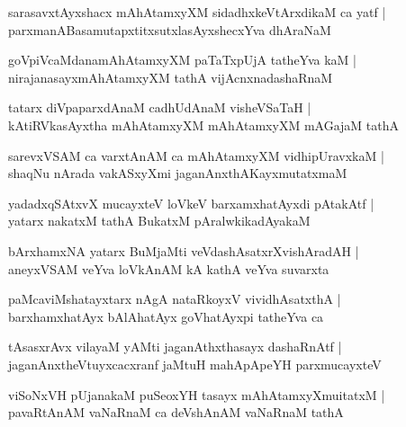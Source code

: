 \documentclass[twoside,12pt,openright]{book}
\newcounter{shloka}[chapter]
\begin{document}
\begin{shloka}%
sarasavxtAyxshacx mAhAtamxyXM sidadhxkeVtArxdikaM ca yatf |\\
parxmanABasamutapxtitxsutxlasAyxshecxYva dhAraNaM 
\end{shloka}

\begin{shloka}%
goVpiVcaMdanamAhAtamxyXM paTaTxpUjA tatheYva kaM |\\
nirajanasayxmAhAtamxyXM tathA vijAcnxnadashaRnaM 
\end{shloka}

\begin{shloka}%
tatarx diVpaparxdAnaM cadhUdAnaM visheVSaTaH |\\
kAtiRVkasAyxtha mAhAtamxyXM mAhAtamxyXM mAGajaM tathA 
\end{shloka}

\begin{shloka}%
sarevxVSAM ca varxtAnAM ca mAhAtamxyXM vidhipUravxkaM |\\
shaqNu nArada vakASxyXmi jaganAnxthAKayxmutatxmaM
\end{shloka}

\begin{shloka}%
yadadxqSAtxvX mucayxteV loVkeV barxamxhatAyxdi pAtakAtf |\\
yatarx nakatxM tathA BukatxM pAralwkikadAyakaM 
\end{shloka}

\begin{shloka}%
bArxhamxNA yatarx BuMjaMti veVdashAsatxrXvishAradAH |\\
aneyxVSAM veYva loVkAnAM kA kathA veYva suvarxta
\end{shloka}

\begin{shloka}%
paMcaviMshatayxtarx nAgA nataRkoyxV vividhAsatxthA |\\
barxhamxhatAyx bAlAhatAyx goVhatAyxpi tatheYva ca 
\end{shloka}

\begin{shloka}%
tAsasxrAvx vilayaM yAMti jaganAthxthasayx dashaRnAtf |\\
jaganAnxtheVtuyxcacxranf jaMtuH mahApApeYH parxmucayxteV 
\end{shloka}

\begin{shloka}%
viSoNxVH pUjanakaM puSeoxYH tasayx mAhAtamxyXmuitatxM |\\
pavaRtAnAM vaNaRnaM ca deVshAnAM vaNaRnaM tathA 
\end{shloka}
\end{document}
